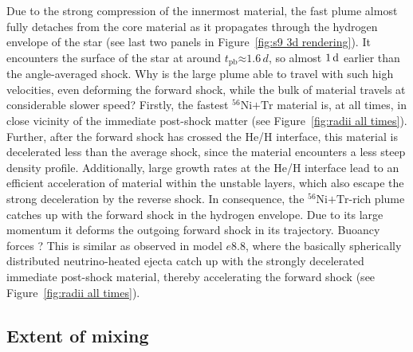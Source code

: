 \documentclass[fleqn,usenatbib]{mnras}
\newcommand{\tpb}{\ensuremath{t_{\text{pb}}}}
\newcommand{\nickel}{\ensuremath{\mathrm{^{56}Ni}}\xspace}
\newcommand{\tracer}{\ensuremath{\mathrm{Tr}}\xspace}
\newcommand{\COM}[1]{{\color{orange}#1}}
\begin{document}
Due to the strong compression of the innermost material, the fast plume almost fully detaches from the core material as it propagates through the hydrogen envelope of the star (see last two panels in Figure~\ref{fig:s9 3d rendering}).
It encounters the surface of the star at around $\tpb \mathord{\approx} 1.6\, d$, so almost $1\,\rm d$ earlier than the angle-averaged shock.
Why is the large plume able to travel with such high velocities, even deforming the forward shock, while the bulk of material travels at considerable slower speed?
Firstly, the fastest $\nickel\mathord{+}\tracer$ material is, at all times, in close vicinity of the immediate post-shock matter (see Figure~\ref{fig:radii all times}). 
Further, after the forward shock has crossed the He/H interface, this material is decelerated less than the average shock, since the material encounters a less steep density profile.
Additionally, large growth rates at the He/H interface lead to an efficient acceleration of material within the unstable layers, which also escape the strong deceleration by the reverse shock.
In consequence, the $\nickel\mathord{+}\tracer$-rich plume catches up with the forward shock in the hydrogen envelope. Due to its large momentum it deforms the outgoing forward shock in its trajectory. \COM{Buoancy forces ?}
This is similar as observed in model $e8.8$, where the basically spherically distributed neutrino-heated ejecta catch up with the strongly decelerated immediate post-shock material, thereby accelerating the forward shock (see Figure~\ref{fig:radii all times}).

\subsection{Extent of mixing}
\end{document}
